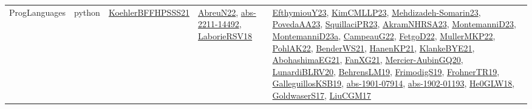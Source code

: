 {\begin{longtable}{lp{3cm}>{\raggedright}p{6cm}>{\raggedright}p{6cm}p{8cm}}
ProgLanguages & python & \href{articles/KoehlerBFFHPSSS21.pdf}{KoehlerBFFHPSSS21}\cite{KoehlerBFFHPSSS21} & \href{articles/AbreuN22.pdf}{AbreuN22}\cite{AbreuN22}, \href{articles/abs-2211-14492.pdf}{abs-2211-14492}\cite{abs-2211-14492}, \href{articles/LaborieRSV18.pdf}{LaborieRSV18}\cite{LaborieRSV18} & \href{papers/EfthymiouY23.pdf}{EfthymiouY23}\cite{EfthymiouY23}, \href{papers/KimCMLLP23.pdf}{KimCMLLP23}\cite{KimCMLLP23}, \href{papers/Mehdizadeh-Somarin23.pdf}{Mehdizadeh-Somarin23}\cite{Mehdizadeh-Somarin23}, \href{papers/PovedaAA23.pdf}{PovedaAA23}\cite{PovedaAA23}, \href{papers/SquillaciPR23.pdf}{SquillaciPR23}\cite{SquillaciPR23}, \href{articles/AkramNHRSA23.pdf}{AkramNHRSA23}\cite{AkramNHRSA23}, \href{articles/MontemanniD23.pdf}{MontemanniD23}\cite{MontemanniD23}, \href{articles/MontemanniD23a.pdf}{MontemanniD23a}\cite{MontemanniD23a}, \href{articles/CampeauG22.pdf}{CampeauG22}\cite{CampeauG22}, \href{articles/FetgoD22.pdf}{FetgoD22}\cite{FetgoD22}, \href{articles/MullerMKP22.pdf}{MullerMKP22}\cite{MullerMKP22}, \href{articles/PohlAK22.pdf}{PohlAK22}\cite{PohlAK22}, \href{papers/BenderWS21.pdf}{BenderWS21}\cite{BenderWS21}, \href{papers/HanenKP21.pdf}{HanenKP21}\cite{HanenKP21}, \href{papers/KlankeBYE21.pdf}{KlankeBYE21}\cite{KlankeBYE21}, \href{articles/AbohashimaEG21.pdf}{AbohashimaEG21}\cite{AbohashimaEG21}, \href{articles/FanXG21.pdf}{FanXG21}\cite{FanXG21}, \href{papers/Mercier-AubinGQ20.pdf}{Mercier-AubinGQ20}\cite{Mercier-AubinGQ20}, \href{articles/LunardiBLRV20.pdf}{LunardiBLRV20}\cite{LunardiBLRV20}, \href{papers/BehrensLM19.pdf}{BehrensLM19}\cite{BehrensLM19}, \href{papers/FrimodigS19.pdf}{FrimodigS19}\cite{FrimodigS19}, \href{papers/FrohnerTR19.pdf}{FrohnerTR19}\cite{FrohnerTR19}, \href{papers/GalleguillosKSB19.pdf}{GalleguillosKSB19}\cite{GalleguillosKSB19}, \href{articles/abs-1901-07914.pdf}{abs-1901-07914}\cite{abs-1901-07914}, \href{articles/abs-1902-01193.pdf}{abs-1902-01193}\cite{abs-1902-01193}, \href{papers/He0GLW18.pdf}{He0GLW18}\cite{He0GLW18}, \href{papers/GoldwaserS17.pdf}{GoldwaserS17}\cite{GoldwaserS17}, \href{papers/LiuCGM17.pdf}{LiuCGM17}\cite{LiuCGM17}\\

\end{longtable}}
